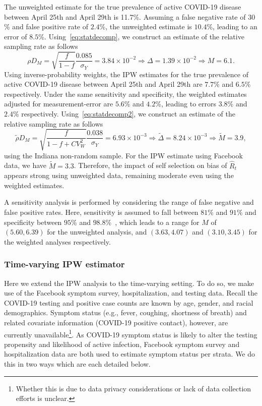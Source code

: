 \documentclass[11pt]{amsart}
\numberwithin{equation}{section}
\theoremstyle{plain}
\begin{document}
The unweighted estimate for the true prevalence of active COVID-19 disease between April 25th and April 29th is 11.7\%.  Assuming a false negative rate of $30$\% and false positive rate of $2.4$\%, the unweighted estimate is $10.4$\%, leading to an error of $8.5$\%.  Using~\eqref{eq:statdecomp}, we construct an estimate of the relative sampling rate as follows
\begin{equation*}
\rho D_M = \sqrt{\frac{f}{1-f}} \frac{\text{0.085}}{\sigma_Y} = 3.84 \times 10^{-2} \Rightarrow \Delta = 1.39 \times 10^{-2} \Rightarrow M = 6.1.
\end{equation*}
Using inverse-probability weights, the IPW estimates for the true prevalence of active COVID-19 disease between April 25th and April 29th are $7.7$\% and $6.5\%$ respectively.  Under the same sensitivity and specificity, the weighted estimates adjusted for measurement-error are $5.6$\% and $4.2$\%, leading to errors $3.8$\% and $2.4$\% respectively.  Using~\eqref{eq:statdecomp2}, we construct an estimate of the relative sampling rate as follows
\begin{equation*}
\tilde \rho D_M = \sqrt{\frac{f}{1-f+CV_W^2}} \frac{\text{0.038}}{\sigma_Y} = 6.93 \times 10^{-3} \Rightarrow \tilde \Delta = 8.24 \times 10^{-3}  \Rightarrow \tilde M = 3.9,
\end{equation*}
using the Indiana non-random sample.  For the IPW estimate using Facebook data, we have $\tilde M = 3.3$. Therefore, the impact of self selection on bias of $\hat R_t$ appears strong using unweighted data, remaining moderate even using the weighted estimates.

A sensitivity analysis is performed by considering the range of false negative and false positive rates.  Here, sensitivity is assumed to fall between $81$\% and $91$\% and specificity between $95$\% and $98.8$\%~\cite{Katz2020}, which leads to a range for $M$ of $(5.60, 6.39)$ for the unweighted analysis, and $(3.63,4.07)$ and $(3.10, 3.45)$ for the weighted analyses respectively.

\subsubsection{Time-varying IPW estimator}

Here we extend the IPW analysis to the time-varying setting.  To do so, we make use of the Facebook symptom survey, hospitalization, and testing data.  Recall the COVID-19 testing and positive case counts are known by age, gender, and racial demographics. Symptom status (e.g., fever, coughing, shortness of breath) and related covariate information (COVID-19 positive contact), however, are currently unavailable\footnote{Whether this is due to data privacy considerations or lack of data collection efforts is unclear.}.  As COVID-19 symptom status is likely to alter the testing propensity and likelihood of active infection, Facebook symptom survey and hospitalization data are both used to estimate symptom status per strata.  We do this in two ways which are each detailed below.
\end{document}
